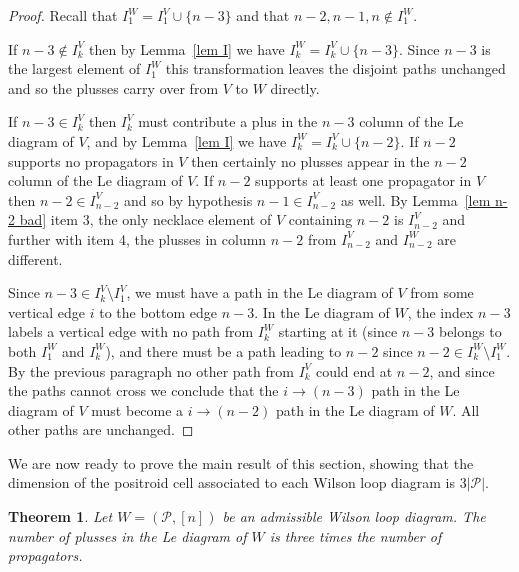 \documentclass[11pt]{article}
\newcommand{\cP}{\mathcal{P}}
\newtheorem{thm}{Theorem}[section]
\theoremstyle{remark}
\theoremstyle{definition}
\begin{document}
\begin{proof}
Recall that $I_1^W = I_1^V\cup \{n-3\}$ and that $n-2,n-1,n \not\in I_1^W$.

  If $n-3\not\in I_{k}^{V}$ then by Lemma~\ref{lem I} we have $I_{k}^{W} = I_k^{V}\cup \{n-3\}$.  Since $n-3$ is the largest element of $I_1^{W}$ this transformation leaves the disjoint paths unchanged and so the plusses carry over from $V$ to $W$ directly.

  If $n-3\in I_{k}^{V}$ then $I_k^V$ must contribute a plus in the $n-3$ column of the Le diagram of $V$, and by Lemma~\ref{lem I} we have $I_{k}^{W} = I_k^{V}\cup \{n-2\}$. If $n-2$ supports no propagators in $V$ then certainly no plusses appear in the $n-2$ column of the Le diagram of $V$. If $n-2$ supports at least one propagator in $V$ then $n-2 \in I_{n-2}^V$ and so by hypothesis $n-1 \in I_{n-2}^V$ as well. By Lemma~\ref{lem n-2 bad} item 3, the only necklace element of $V$ containing $n-2$ is $I_{n-2}^{V}$ and further with item 4, the plusses in column $n-2$ from $I_{n-2}^V$ and $I_{n-2}^W$ are different.

  Since $n-3 \in I_k^V \setminus I_1^V$, we must have a path in the Le diagram of $V$ from some vertical edge $i$ to the bottom edge $n-3$.  In the Le diagram of $W$, the index $n-3$ labels a vertical edge with no path from $I_k^W$ starting at it (since $n-3$ belongs to both $I_1^W$ and $I_k^W$), and there must be a path leading to $n-2$ since $n-2 \in I_k^W \setminus I_1^W$.  By the previous paragraph no other path from $I_k^V$ could end at $n-2$, and since the paths cannot cross we conclude that the $i\rightarrow (n-3)$ path in the Le diagram of $V$ must become a $i\rightarrow (n-2)$ path in the Le diagram of $W$. All other paths are unchanged.
\end{proof}

We are now ready to prove the main result of this section, showing that the dimension of the positroid cell associated to each Wilson loop diagram is $3|\cP|$. 

\begin{thm}\label{thm dim}
Let $W = (\cP, [n])$ be an admissible Wilson loop diagram.  The number of plusses in the Le diagram of $W$ is three times the number of propagators.
\end{thm}
\end{document}
